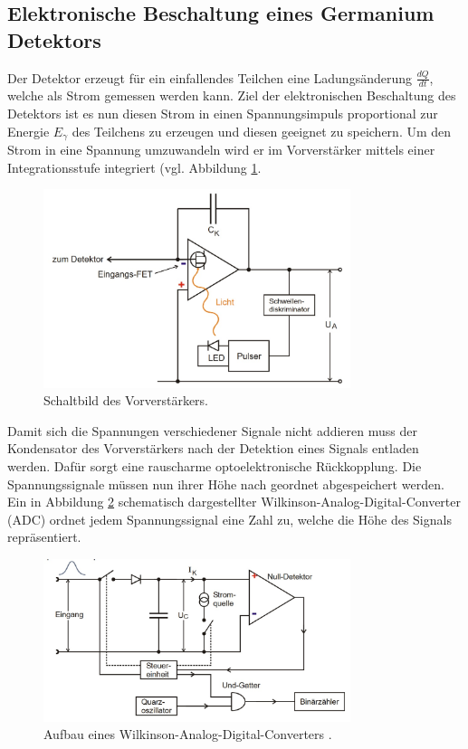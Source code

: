 \subsection{Elektronische Beschaltung eines Germanium Detektors}
\label{subsec:Elektronische Beschaltung eines Germanium Detektors}
Der Detektor erzeugt für ein einfallendes Teilchen eine Ladungsänderung $\frac{dQ}{dt}$, welche als Strom gemessen werden kann.
Ziel der elektronischen Beschaltung des Detektors ist es nun diesen Strom in einen Spannungsimpuls proportional zur Energie $E_\gamma$ des Teilchens zu erzeugen und diesen geeignet zu speichern.
Um den Strom in eine Spannung umzuwandeln wird er im Vorverstärker mittels einer Integrationsstufe integriert (vgl. Abbildung \ref{fig:t:1}.
\begin{figure}
\centering
\includegraphics[width=0.8\textwidth]{content/skizzen/aufbau2.jpg}
\caption{Schaltbild des Vorverstärkers.}
\label{fig:t:1}
\end{figure}
\cite{sample}
Damit sich die Spannungen verschiedener Signale nicht addieren muss der Kondensator des Vorverstärkers nach der Detektion eines Signals entladen werden.
Dafür sorgt eine rauscharme optoelektronische Rückkopplung.
Die Spannungssignale müssen nun ihrer Höhe nach geordnet abgespeichert werden.
Ein in Abbildung \ref{fig:t:2} schematisch dargestellter Wilkinson-Analog-Digital-Converter (ADC) ordnet jedem Spannungssignal eine Zahl zu, welche die Höhe des Signals repräsentiert.
\begin{figure}
\centering
\includegraphics[width=0.8\textwidth]{content/skizzen/aufbau3.jpg}
\caption{Aufbau eines Wilkinson-Analog-Digital-Converters \cite{sample}.}
\label{fig:t:2}
\end{figure}
